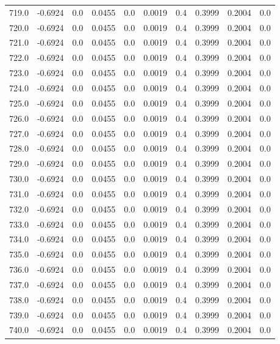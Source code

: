 \begin{longtable}{lrrrrrrrrr}
719.0 & -0.6924 & 0.0 & 0.0455 & 0.0 & 0.0019 & 0.4 & 0.3999 & 0.2004 & 0.0 \\
720.0 & -0.6924 & 0.0 & 0.0455 & 0.0 & 0.0019 & 0.4 & 0.3999 & 0.2004 & 0.0 \\
721.0 & -0.6924 & 0.0 & 0.0455 & 0.0 & 0.0019 & 0.4 & 0.3999 & 0.2004 & 0.0 \\
722.0 & -0.6924 & 0.0 & 0.0455 & 0.0 & 0.0019 & 0.4 & 0.3999 & 0.2004 & 0.0 \\
723.0 & -0.6924 & 0.0 & 0.0455 & 0.0 & 0.0019 & 0.4 & 0.3999 & 0.2004 & 0.0 \\
724.0 & -0.6924 & 0.0 & 0.0455 & 0.0 & 0.0019 & 0.4 & 0.3999 & 0.2004 & 0.0 \\
725.0 & -0.6924 & 0.0 & 0.0455 & 0.0 & 0.0019 & 0.4 & 0.3999 & 0.2004 & 0.0 \\
726.0 & -0.6924 & 0.0 & 0.0455 & 0.0 & 0.0019 & 0.4 & 0.3999 & 0.2004 & 0.0 \\
727.0 & -0.6924 & 0.0 & 0.0455 & 0.0 & 0.0019 & 0.4 & 0.3999 & 0.2004 & 0.0 \\
728.0 & -0.6924 & 0.0 & 0.0455 & 0.0 & 0.0019 & 0.4 & 0.3999 & 0.2004 & 0.0 \\
729.0 & -0.6924 & 0.0 & 0.0455 & 0.0 & 0.0019 & 0.4 & 0.3999 & 0.2004 & 0.0 \\
730.0 & -0.6924 & 0.0 & 0.0455 & 0.0 & 0.0019 & 0.4 & 0.3999 & 0.2004 & 0.0 \\
731.0 & -0.6924 & 0.0 & 0.0455 & 0.0 & 0.0019 & 0.4 & 0.3999 & 0.2004 & 0.0 \\
732.0 & -0.6924 & 0.0 & 0.0455 & 0.0 & 0.0019 & 0.4 & 0.3999 & 0.2004 & 0.0 \\
733.0 & -0.6924 & 0.0 & 0.0455 & 0.0 & 0.0019 & 0.4 & 0.3999 & 0.2004 & 0.0 \\
734.0 & -0.6924 & 0.0 & 0.0455 & 0.0 & 0.0019 & 0.4 & 0.3999 & 0.2004 & 0.0 \\
735.0 & -0.6924 & 0.0 & 0.0455 & 0.0 & 0.0019 & 0.4 & 0.3999 & 0.2004 & 0.0 \\
736.0 & -0.6924 & 0.0 & 0.0455 & 0.0 & 0.0019 & 0.4 & 0.3999 & 0.2004 & 0.0 \\
737.0 & -0.6924 & 0.0 & 0.0455 & 0.0 & 0.0019 & 0.4 & 0.3999 & 0.2004 & 0.0 \\
738.0 & -0.6924 & 0.0 & 0.0455 & 0.0 & 0.0019 & 0.4 & 0.3999 & 0.2004 & 0.0 \\
739.0 & -0.6924 & 0.0 & 0.0455 & 0.0 & 0.0019 & 0.4 & 0.3999 & 0.2004 & 0.0 \\
740.0 & -0.6924 & 0.0 & 0.0455 & 0.0 & 0.0019 & 0.4 & 0.3999 & 0.2004 & 0.0 \\

\end{longtable}
